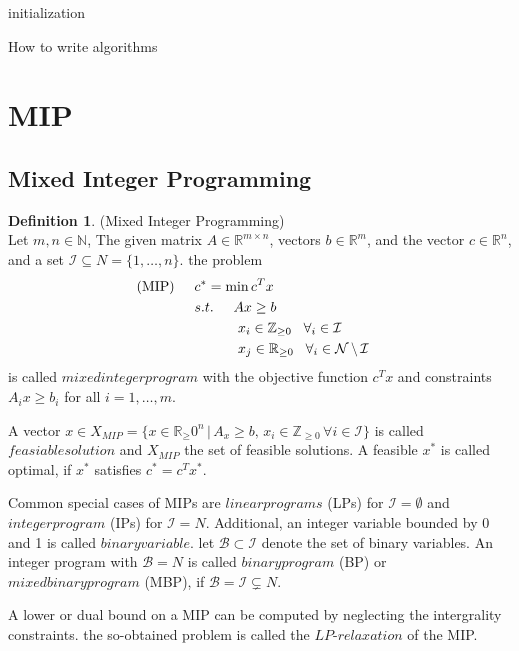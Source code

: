 \documentclass[11pt]{article}
\theoremstyle{definition}
\newtheorem{definition}{Definition}[section] %
\begin{document}
\begin{algorithm}[H]
\SetAlgoLined
{}
 initialization\;
 \caption{How to write algorithms}
\end{algorithm}





\section{MIP}
\subsection{Mixed Integer Programming}
\begin{definition}
(Mixed Integer Programming)\\
Let $m,n \in \mathbb{N}$, The given matrix $A\in \mathbb{R}^{m \times n}$, vectors $b\in \mathbb{R}^m$, and the vector $c \in \mathbb{R}^n$, and a set $\mathcal{I} \subseteq N = \{ 1,\dots,n \} $. the problem 
\begin{align*}
\text{(MIP)} \hspace{5mm} &c^* = \text{min}\,c^Tx& \\
&s.t.\hspace{5mm} Ax \geq b  \\
&\hspace{11mm} x_i \in \mathbb{Z}_{\geq0} \hspace{3mm} \forall_i \in \mathcal{I}\\ 
&\hspace{11mm} x_j \in \mathbb{R}_{\geq0} \hspace{3mm} \forall_i \in \mathcal{N}\,\backslash\,  \mathcal{I}
\end{align*}
is called $mixed integer program$ with the objective function $c^Tx$ and constraints $A_ix \geq b_i$ for all $i = 1,\dots ,m$.\par
\label{dif:mip}
\end{definition}
A vector $x\in X_{MIP} = \{x \in \mathbb{R}_\geq0^n\,|\,A_x \geq b, \, x_i \in \mathbb{Z}_{\geq0}\,\forall i \in \mathcal{I}  \}$ is called $feasiable solution$ and $X_{MIP}$ the set of feasible solutions. A feasible $x^*$ is called optimal, if $x^*$ satisfies $c^*=c^Tx^*$. \par
Common special cases of MIPs are $linear programs$ (LPs) for $\mathcal{I} = \emptyset $ and $integer program$ (IPs) for $\mathcal{I} = N$. Additional, an integer variable bounded by 0 and 1 is called $binary variable$. let $\mathcal{B} \subset \mathcal{I}$ denote the set of binary variables. An integer program with $\mathcal{B} = N $ is called $binary program$ (BP) or $mixed binary program$ (MBP), if $\mathcal{B} = \mathcal{I} \subsetneq N$. \par
A lower or dual bound on a MIP can be computed by neglecting the intergrality constraints. the so-obtained problem is called the $LP\text{-}relaxation$ of the MIP. \par
\end{document}
